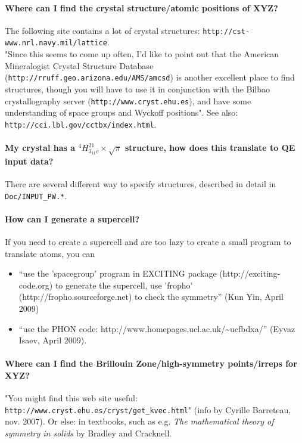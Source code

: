 \documentclass[12pt,a4paper]{article}
\begin{document}
\paragraph{Where can I find the crystal structure/atomic positions of XYZ?}

The following site contains a lot of crystal structures: 
\texttt{http://cst-www.nrl.navy.mil/lattice}.\\
"Since this seems to come up often, I'd like to point out that the
American Mineralogist Crystal Structure Database
(\texttt{http://rruff.geo.arizona.edu/AMS/amcsd}) 
is another excellent place to
find structures, though you will have to use it in conjunction with
the Bilbao crystallography server (\texttt{http://www.cryst.ehu.es}),  
and have some understanding of space groups and Wyckoff positions".
See also:
\texttt{http://cci.lbl.gov/cctbx/index.html}.

\paragraph{My crystal has a $^4H^{21}_{3_11c}\times \sqrt{\pi}$
structure, how does this translate to QE input data?}

There are several different way to specify structures,
described in detail in \texttt{Doc/INPUT\_PW.*}.

\paragraph{How can I generate a supercell?}

If you need to create a supercell and are too lazy to create a 
small program to translate atoms, you can
\begin{itemize}
\item ``use the 'spacegroup' program in EXCITING package 
(http://exciting-code.org) to generate the supercell,
use 'fropho' (http://fropho.sourceforge.net) to check the symmetry''
(Kun Yin, April 2009)
\item ``use the PHON code: http://www.homepages.ucl.ac.uk/\~{}ucfbdxa/''
(Eyvaz Isaev, April 2009).
\end{itemize}

\paragraph{Where can I find the Brillouin Zone/high-symmetry
  points/irreps for XYZ?} 

"You might find this web site useful:
\texttt{http://www.cryst.ehu.es/cryst/get\_kvec.html}" (info by Cyrille
Barreteau, nov. 2007). Or else: in textbooks, such as e.g. {\em The
mathematical theory of symmetry in solids} by Bradley and Cracknell.
\end{document}
